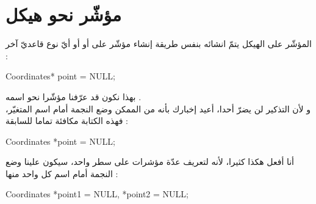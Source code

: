 \section{مؤشّر نحو هيكل}
المؤشّر على الهيكل يتمّ انشائه بنفس طريقة إنشاء مؤشّر على
أو
أو أيّ نوع قاعديّ آخر :
\begin{Csource}
Coordinates* point = NULL;
\end{Csource}
بهذا نكون قد عرّفنا مؤشّرا نحو
اسمه
.\\
و لأن التذكير لن يضرّ أحدا، أعيد إخبارك بأنه من الممكن وضع النجمة أمام اسم المتغيّر، فهذه الكتابة مكافئة تماما للسابقة :
\begin{Csource}
Coordinates *point = NULL;
\end{Csource}
أنا أفعل هكذا كثيرا، لأنه لتعريف عدّة مؤشرات على سطر واحد، سيكون علينا وضع النجمة أمام اسم كل واحد منها :
\begin{Csource}
Coordinates *point1 = NULL, *point2 = NULL;
\end{Csource}
